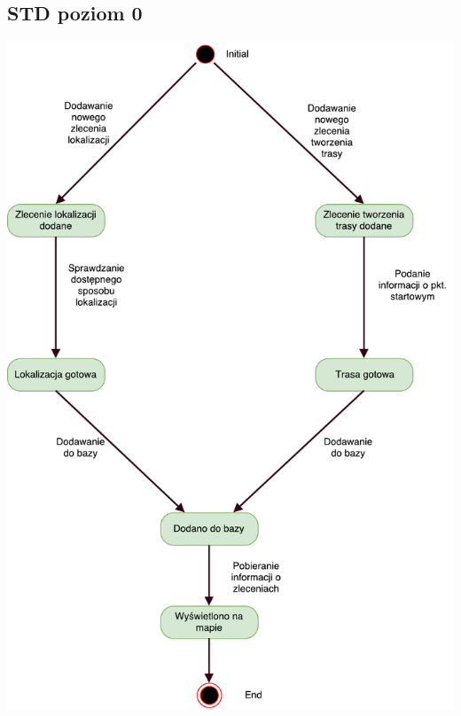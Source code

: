 \documentclass[11pt]{article}
\begin{document}
	\subsection{STD poziom 0}
	\begin{center}
		\includegraphics[scale=0.9]{STD0.pdf}
	\end{center}
	\newpage
\end{document}
